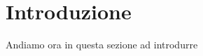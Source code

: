\documentclass[../main.tex]{subfiles}
\begin{document}
\clearpage
\thispagestyle{empty}
\vspace*{7cm}
\section{Introduzione}
\vspace*{1.5cm}

Andiamo ora in questa sezione ad introdurre
\end{document}
